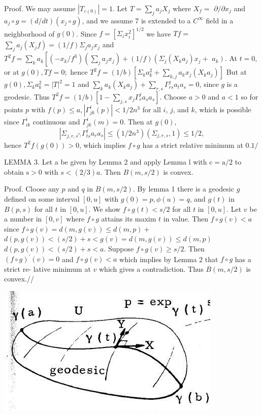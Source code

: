 \documentclass[10pt]{article}
\begin{document}
Proof. We may assume $\left|T_{\varepsilon(0)}\right|=1$. Let $T=\sum_{j} a_{j} X_{j}$ where $X_{f}=$ $\partial / \partial x_{j}$ and $a_{j} \circ g=(d / d t)\left(x_{j} \circ g\right)$, and we assume 7 is extended to a $C^{\infty}$ field in a neighborhood of $g(0)$. Since $f=\left[\Sigma_{i} x_{i}^{2}\right]^{1 / 2}$ we have $T f=$ $\sum_{j} a_{j}\left(X_{j} f\right)=(1 / f) \Sigma_{j} a_{j} x_{j}$ and $T^{2} f=\sum_{k} a_{k}\left[\left(-x_{k} / f^{3}\right)\left(\sum_{j} a_{j} x_{j}\right)+(1 / f)\left(\Sigma_{j}\left(X_{k} a_{j}\right) x_{j}+\right.\right.$ $\left.a_{k}\right)$. At $t=0$, or at $g(0), T f=0 ;$ hence $T^{2} f=(1 / b)\left[\Sigma_{k} a_{k}^{2}+\sum_{k, j} a_{k} x_{j}\left(X_{k} a_{j}\right)\right]$ But at $g(0), \Sigma_{k} a_{k}^{2}=|T|^{2}=1$ and $\sum_{k} a_{k}\left(X_{k} a_{j}\right)+\sum_{r, s} \Gamma_{r s}^{j} a_{t} a_{s}=0$, since $g$ is a geodesic. Thus $T^{2} f=(1 / b)\left[1-\sum_{j, s} x_{j} \Gamma_{r}^{j} a_{s} a_{s}\right]$. Choose $a>0$ and $a<1$ so for points $p$ with $f(p) \leq a,\left|\Gamma_{j k}^{i}(p)\right|<1 / 2 n^{3}$ for all $i$, $j$, and $k$, which is possible since $\Gamma_{i k}^{i}$ continuous and $\Gamma_{j k}^{i}(m)=0$. Then at $g(0)$,
$$
\left|\Sigma_{j, r, s^{x_{j}}} \Gamma_{t s}^{j} a_{r} a_{s}\right| \leq\left(1 / 2 n^{3}\right)\left(\Sigma_{j, r, s}, 1\right) \leq 1 / 2,
$$
hence $T^{2} f(g(0))>0$, which implies $f \circ g$ has a strict relative minimum at $0.1 /$

LEMMA 3. Let a be given by Lemma 2 and apply Lemma l with $\mathrm{c}=\mathrm{a} / 2$ to obtain $\mathrm{s}>0$ with $s<(2 / 3) a .$ Then $B(m, s / 2)$ is convex.

Proof. Cloose any $p$ and $q$ in $B(m, s / 2)$. By lemma 1 there is a geodesic $g$ defined on some interval $[0, u]$ with $g(0)=p, \phi(u)=q$, and $g(t)$ in $B(p, s)$ for all $t$ in $[0, u]$. We show $f \circ g(t)<s / 2$ for all $t$ in $[0, u]$. Let $v$ be a number in $[0, v]$ where $f \circ g$ attains its maxim $t$ in value. Then $f \circ g(v)<a$ since $f \circ g(v)=d(m, g(v)) \leq d(m, p)+$ $d(p, g(v))<(s / 2)+s<g(v)=d(m, g(v)) \leq d(m, p)$ $d(p, g(v))<(s / 2)+s<a .$ Suppose $f \circ g(v) \geq s / 2 .$ Then $(f \circ g)^{\prime}(v)=0$ and $f \circ g(v)<a$ which implies by Lemma 2 that $f \circ g$ has a strict re- lative minimum at $v$ which gives a contradiction. Thus $B(m, s / 2)$ is convex.//

\includegraphics[max width=\textwidth]{2022_07_16_f4e476ee2159dc67e746g-72}
\end{document}
